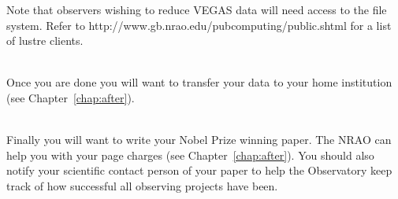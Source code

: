 \begin{description}[leftmargin=*]
Note that observers wishing to reduce VEGAS data will need access to the
 file system.  Refer to
{http://www.gb.nrao.edu/pubcomputing/public.shtml} for a list of lustre clients.

\item [Step 10 - Transfer your data]\ \\
Once you are done you will want to transfer your data to your home institution
(see Chapter~\ref{chap:after}).

\item [Step 11 - Keep in touch]\ \\
Finally you will want to write your Nobel Prize winning paper. The \gls{NRAO} can
help you with your page charges (see Chapter~\ref{chap:after}). You should also
notify your scientific contact person of your paper to help the Observatory
keep track of how successful all observing projects have been.

\end{description}



